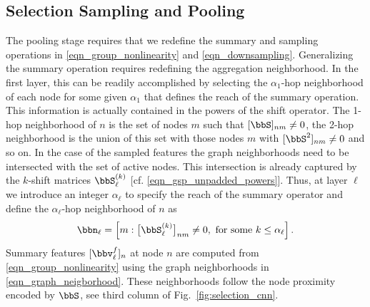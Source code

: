 %
\subsection{Selection Sampling and Pooling}\label{sec_selection_pooling}

The pooling stage requires that we redefine the summary and sampling operations in \eqref{eqn_group_nonlinearity} and \eqref{eqn_downsampling}. Generalizing the summary operation requires redefining the aggregation neighborhood. In the first layer, this can be readily accomplished by selecting the $\alpha_{1}$-hop neighborhood of each node for some given $\alpha_{1}$ that defines the reach of the summary operation. This information is actually contained in the powers of the shift operator. The 1-hop neighborhood of $n$ is the set of nodes $m$ such that $[\bbS]_{nm} \neq 0$, the 2-hop neighborhood is the union of this set with those nodes $m$ with $[\bbS^2]_{nm} \neq 0$ and so on. In the case of the sampled features the graph neighborhoods need to be intersected with the set of active nodes. This intersection is already captured by the $k$-shift matrices $\bbS_{\ell}^{(k)}$ [cf. \eqref{eqn_gsp_unpadded_powers}]. Thus, at layer $\ell$ we introduce an integer $\alpha_{\ell}$ to specify the reach of the summary operator and define the $\alpha_{\ell}$-hop neighborhood of $n$ as
% 
\begin{equation} \label{eqn_graph_neigborhood}
   \bbn_\ell = \left[ m: \big[\bbS_{\ell}^{(k)}\big]_{nm} \neq 0,\ 
                       \text{for some}\ k\leq \alpha_{\ell} \right].
\end{equation}
%
Summary features $[\bbv^{f}_{\ell}]_n$ at node $n$ are computed from \eqref{eqn_group_nonlinearity} using the graph neighborhoods in \eqref{eqn_graph_neigborhood}. These neighborhoods follow the node proximity encoded by $\bbS$, see third column of Fig.~\ref{fig:selection_cnn}.

